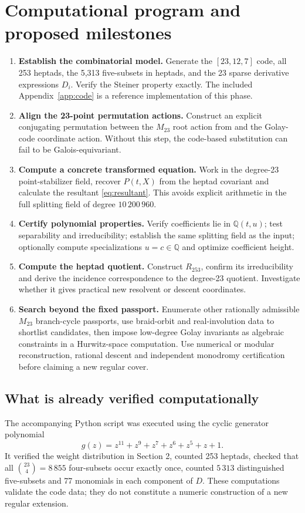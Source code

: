 \documentclass[11pt,letterpaper]{article}
\theoremstyle{definition}
\newcommand{\QQ}{\mathbb{Q}}
\begin{document}
\section{Computational program and proposed milestones}
\begin{enumerate}[label=\textbf{Phase \arabic*:},leftmargin=*]
\item \textbf{Establish the combinatorial model.} Generate the \([23,12,7]\) code, all 253 heptads, the 5,313 five-subsets in heptads, and the 23 sparse derivative expressions \(D_i\). Verify the Steiner property exactly. The included Appendix~\ref{app:code} is a reference implementation of this phase.
\item \textbf{Align the 23-point permutation actions.} Construct an explicit conjugating permutation between the \(M_{23}\) root action from \cite{HJLPPZ26} and the Golay-code coordinate action. Without this step, the code-based substitution can fail to be Galois-equivariant.
\item \textbf{Compute a concrete transformed equation.} Work in the degree-23 point-stabilizer field, recover \(P(t,X)\) from the heptad covariant and calculate the resultant \eqref{eq:resultant}. This avoids explicit arithmetic in the full splitting field of degree \(10\,200\,960\).
\item \textbf{Certify polynomial properties.} Verify coefficients lie in \(\QQ(t,u)\); test separability and irreducibility; establish the same splitting field as the input; optionally compute specializations \(u=c\in\QQ\) and optimize coefficient height.
\item \textbf{Compute the heptad quotient.} Construct \(R_{253}\), confirm its irreducibility and derive the incidence correspondence to the degree-23 quotient. Investigate whether it gives practical new resolvent or descent coordinates.
\item \textbf{Search beyond the fixed passport.} Enumerate other rationally admissible \(M_{23}\) branch-cycle passports, use braid-orbit and real-involution data to shortlist candidates, then impose low-degree Golay invariants as algebraic constraints in a Hurwitz-space computation. Use numerical or modular reconstruction, rational descent and independent monodromy certification before claiming a new regular cover.
\end{enumerate}

\subsection{What is already verified computationally}
The accompanying Python script was executed using the cyclic generator polynomial
\[
g(z)=z^{11}+z^9+z^7+z^6+z^5+z+1.
\]
It verified the weight distribution in Section 2, counted 253 heptads, checked that all \(\binom{23}{4}=8\,855\) four-subsets occur exactly once, counted \(5\,313\) distinguished five-subsets and 77 monomials in each component of \(D\). These computations validate the code data; they do not constitute a numeric construction of a new regular extension.
\end{document}
